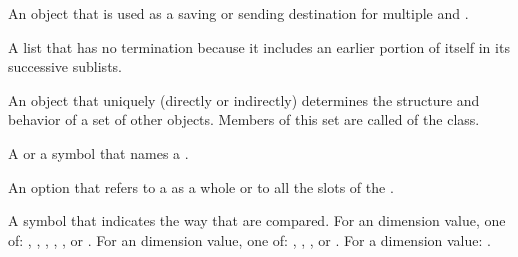 \begin{glossary-list}

%
%
%
An object that is used as a saving or sending destination for multiple
 and .


%
%
A list that has no termination because it includes an earlier portion of
itself in its successive sublists.


\glent[class]
%
%
%
An object that uniquely (directly or indirectly) determines the structure and
behavior of a set of other objects. Members of this set are called
 of the class.


%
%
%
%
A  or a symbol that names a .


%
%
An option that refers to a  as a whole or to all the slots of the
.


%
%
%
%
%
%
%
%
%
%
%
%
%
%
A symbol that indicates the way that  are compared.
For an  dimension value, one of: ,
, , , ,
or .  For an  dimension value, one of:
, , , or .  For a 
dimension value: .


\end{glossary-list}

